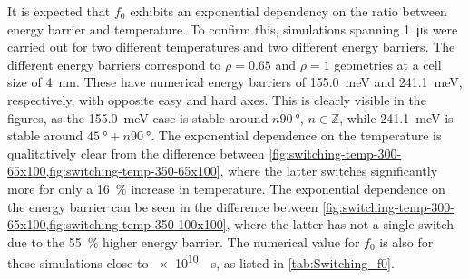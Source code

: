 \documentclass[11pt,a4paper,english]{article}
\begin{document}
It is expected that $f_0$ exhibits an exponential dependency on the ratio between energy barrier and temperature. To confirm this, simulations spanning \SI{1}{\micro\second} were carried out for two different temperatures and two different energy barriers. The different energy barriers correspond to $\rho=0.65$ and $\rho=1$ geometries at a cell size of \SI{4}{\nano\metre}. These have numerical energy barriers of \SI{155.0}{\milli\electronvolt} and \SI{241.1}{\milli\electronvolt}, respectively, with opposite easy and hard axes. This is clearly visible in the figures, as the \SI{155.0}{\milli\electronvolt} case is stable around $n\SI{90}{\degree}$, $n \in \mathbb{Z}$, while \SI{241.1}{\milli\electronvolt} is stable around $\SI{45}{\degree} + n\SI{90}{\degree}$. The exponential dependence on the temperature is qualitatively clear from the difference between \cref{fig:switching-temp-300-65x100,fig:switching-temp-350-65x100}, where the latter switches significantly more for only a \SI{16}{\percent} increase in temperature. The exponential dependence on the energy barrier can be seen in the difference between \cref{fig:switching-temp-300-65x100,fig:switching-temp-350-100x100}, where the latter has not a single switch due to the \SI{55}{\percent} higher energy barrier. The numerical value for $f_0$ is also for these simulations close to \SI{e10}{\per\second}, as listed in \cref{tab:Switching_f0}.
\end{document}
